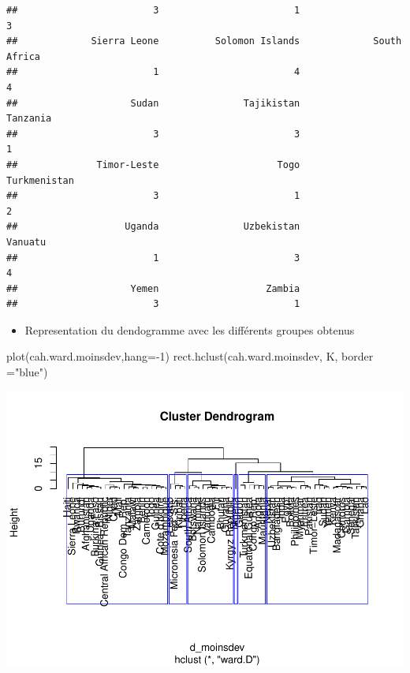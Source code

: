 \documentclass[
]{article}
\newenvironment{Shaded}{}{}
\newcommand{\AttributeTok}[1]{#1}
\newcommand{\DecValTok}[1]{#1}
\newcommand{\FunctionTok}[1]{#1}
\newcommand{\NormalTok}[1]{#1}
\newcommand{\SpecialCharTok}[1]{\textcolor[rgb]{0.00,0.50,0.50}{#1}}
\newcommand{\StringTok}[1]{\textcolor[rgb]{0.00,0.50,0.50}{#1}}
\providecommand{\tightlist}{%
  \setlength{\itemsep}{0pt}\setlength{\parskip}{0pt}}
\begin{document}
\begin{verbatim}
##                        3                        1                        3 
##             Sierra Leone          Solomon Islands             South Africa 
##                        1                        4                        4 
##                    Sudan               Tajikistan                 Tanzania 
##                        3                        3                        1 
##              Timor-Leste                     Togo             Turkmenistan 
##                        3                        1                        2 
##                   Uganda               Uzbekistan                  Vanuatu 
##                        1                        3                        4 
##                    Yemen                   Zambia 
##                        3                        1
\end{verbatim}

\begin{itemize}
\tightlist
\item
  Representation du dendogramme avec les différents groupes obtenus
\end{itemize}

\begin{Shaded}
\begin{Highlighting}[]
\FunctionTok{plot}\NormalTok{(cah.ward.moinsdev,}\AttributeTok{hang=}\SpecialCharTok{{-}}\DecValTok{1}\NormalTok{)}
\FunctionTok{rect.hclust}\NormalTok{(cah.ward.moinsdev, K, }\AttributeTok{border =}\StringTok{"blue"}\NormalTok{)}
\end{Highlighting}
\end{Shaded}

\includegraphics{Projet_files/figure-latex/unnamed-chunk-35-1.pdf}
\end{document}

